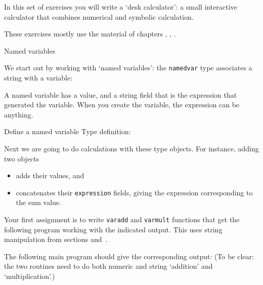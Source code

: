 
In this set of exercises you will write a `desk calculator':
a small interactive calculator
that combines numerical and symbolic calculation.

These exercises mostly use the material of chapters
, , .

 {Named variables}

We start out by working with `named variables':
the \lstinline{namedvar} type associates a string with a variable:
%

A named variable has a value, and a string field that is the expression
that generated the variable.
When you create the variable, the expression can be anything.
%

\begin{slide}{Define a named variable}
  \label{sl:f-named-var-def}
  Type definition:
\end{slide}

Next we are going to do calculations with these type objects.
For instance, adding two objects
\begin{itemize}
\item
  adds their values, and
\item concatenates their \lstinline{expression} fields,
  giving the expression corresponding to the sum value.
\end{itemize}

Your first assignment is to write
\lstinline{varadd} and \lstinline{varmult} functions
that get the following program working
with the indicated output.
This uses string manipulation from sections
 and~.

\begin{exercise}
  \label{ex:f-named-var}
  The following main program should give the corresponding output:
  \def\snippetcodefraction{.4}
  \def\snippetanswfraction{.6}
  (To be clear: the two routines need to do both numeric and string
  `addition' and `multiplication'.)
\end{exercise}

